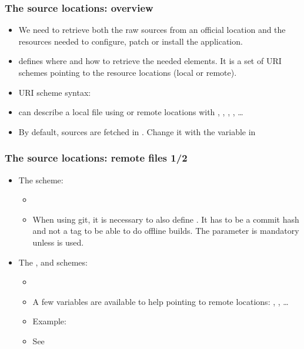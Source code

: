 \begin{frame}
  \frametitle{The source locations: overview}
  \begin{itemize}
    \item We need to retrieve both the raw sources from an official
      location and the resources needed to configure, patch or install
      the application.
    \item {} defines where and how to retrieve the
      needed elements. It is a set of URI schemes pointing to the
      resource locations (local or remote).
    \item URI scheme syntax: 
    \item {} can describe a local file using 
      or remote locations with , ,
      , , \dots
    \item By default, sources are fetched in
      . Change it with the 
      variable in 
  \end{itemize}
\end{frame}

\begin{frame}
  \frametitle{The source locations: remote files 1/2}
  \begin{itemize}
    \item The  scheme:
      \begin{itemize}
        \item {}
        \item When using git, it is necessary to also define
          . It has to be a commit hash and not a tag to
          be able to do offline builds. The  parameter is
          mandatory unless  is used.
      \end{itemize}
    \item The ,  and  schemes:
      \begin{itemize}
        \item {}
        \item A few variables are available to help pointing to remote
          locations: ,
          , \dots
        \item Example:
        \item See 
      \end{itemize}
  \end{itemize}
\end{frame}

